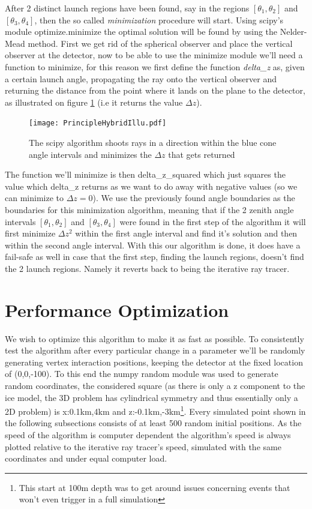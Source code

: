 After 2 distinct launch regions have been found, say in the regions
$[\theta_1,\theta_2]$ and $[\theta_3,\theta_4]$, 
then the so called \textit{minimization} procedure will
start. Using scipy's module optimize.minimize the optimal solution will be
found by using the Nelder-Mead method\cite{10.1093/comjnl/7.4.308}. First we
get rid of the spherical observer and place the vertical observer at the
detector, now to be able to use the minimize module we'll need a function to
minimize, for this reason we first define the function \textit{delta\_z} as,
given a certain launch angle, propagating the ray onto the vertical observer
and returning the distance from the point where it lands on the plane to the
detector, as illustrated on figure \ref{fig:PrincipleHybridIllu} (i.e it
returns the value $\Delta z$).
\begin{figure}
  \centering
  \texttt{[image: PrincipleHybridIllu.pdf]}
  \caption{The scipy algorithm shoots rays in a direction within the blue cone angle intervals and minimizes the $\Delta z$ that gets returned}
  \label{fig:PrincipleHybridIllu}
\end{figure}
The function we'll minimize is then delta\_z\_squared which just squares the
value which delta\_z returns as we want to do away with negative values (so we
can minimize to $\Delta z=0$). We use the previously found angle boundaries as
the boundaries for this minimization algorithm, meaning that if the 2 zenith
angle intervals $[\theta_1,\theta_2]$ and $[\theta_3,\theta_4]$ were found in
the first step of the algorithm it will first minimize $\Delta z^2$ within the
first angle interval and find it's solution and then within the second angle
interval. With this our algorithm is done, it does have a fail-safe as well in case
that the first step, finding the launch regions, doesn't find the 2 launch
regions.  Namely it reverts back to being the iterative ray tracer.

\section{Performance Optimization} 
We wish to optimize this algorithm to make
it as fast as possible.  To consistently test the algorithm after every
particular change in a parameter we'll be randomly generating vertex
interaction positions, keeping the detector at the fixed location of (0,0,-100).  To
this end the numpy random module was used to generate random coordinates, the
considered square (as there is only a z component to the ice model, the 3D
problem has cylindrical symmetry and thus essentially only a 2D problem) is
x:0.1km,4km and z:-0.1km,-3km\footnote{This start at 100m depth was to get
around issues concerning events that won't even trigger in a full simulation}.
Every simulated point shown in the following subsections consists of at least
500 random initial positions.  As the speed of the algorithm is computer
dependent the algorithm's speed is always plotted relative to the iterative ray
tracer's speed, simulated with the same coordinates and under equal computer load.

